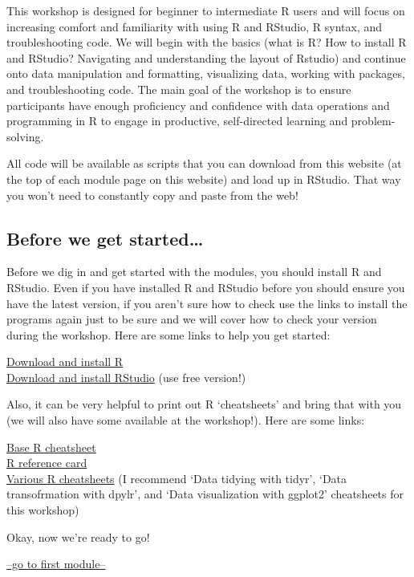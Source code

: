 \documentclass[
]{article}
\begin{document}
This workshop is designed for beginner to intermediate R users and will
focus on increasing comfort and familiarity with using R and RStudio, R
syntax, and troubleshooting code. We will begin with the basics (what is
R? How to install R and RStudio? Navigating and understanding the layout
of Rstudio) and continue onto data manipulation and formatting,
visualizing data, working with packages, and troubleshooting code. The
main goal of the workshop is to ensure participants have enough
proficiency and confidence with data operations and programming in R to
engage in productive, self-directed learning and problem-solving.

All code will be available as scripts that you can download from this
website (at the top of each module page on this website) and load up in
RStudio. That way you won't need to constantly copy and paste from the
web!

\hypertarget{before-we-get-started}{%
\subsection{Before we get started\ldots{}}\label{before-we-get-started}}

Before we dig in and get started with the modules, you should install R
and RStudio. Even if you have installed R and RStudio before you should
ensure you have the latest version, if you aren't sure how to check use
the links to install the programs again just to be sure and we will
cover how to check your version during the workshop. Here are some links
to help you get started:

\href{https://cran.r-project.org/}{Download and install R}\\
\href{https://www.rstudio.com/products/rstudio/download/}{Download and
install RStudio} (use free version!)

Also, it can be very helpful to print out R `cheatsheets' and bring that
with you (we will also have some available at the workshop!). Here are
some links:

\href{https://www.rstudio.com/wp-content/uploads/2016/05/base-r.pdf}{Base
R cheatsheet}\\
\href{https://cran.r-project.org/doc/contrib/Short-refcard.pdf}{R
reference card}\\
\href{https://posit.co/resources/cheatsheets/?type=posit-cheatsheets\&_page=2/}{Various
R cheatsheets} (I recommend `Data tidying with tidyr', `Data
transofrmation with dpylr', and `Data visualization with ggplot2'
cheatsheets for this workshop)

Okay, now we're ready to go!

\href{day1_1.html}{--go to first module--}
\end{document}
